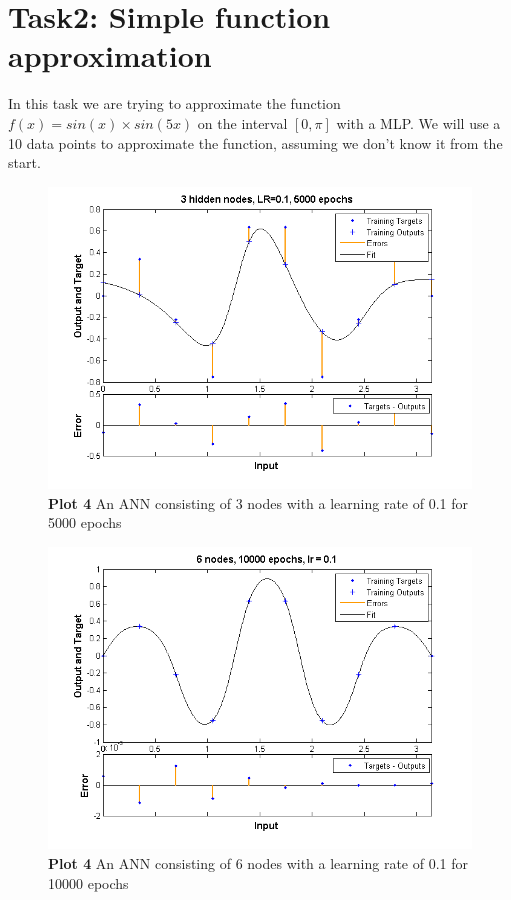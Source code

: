 \documentclass[a4paper]{article}
\begin{document}
\section{Task2: Simple function approximation}
In this task we are trying to approximate the function $f(x) = sin(x) \times sin(5x)$ on the interval $[0, \pi]$ with a MLP. We will use a 10 data points to approximate the function, assuming we don't know it from the start. 
\begin{figure}[h!] %
	\includegraphics[scale=0.8]{plot4_3nodes.png}
	\caption{\label{fig:plot4_3nodes.png}\textbf{Plot 4} An ANN consisting of 3 nodes with a learning rate of 0.1 for 5000 epochs}
\end{figure}
\begin{figure}[h!] %
	\includegraphics[scale=0.8]{plot4_6nodes.png}
	\caption{\label{fig:plot4_6nodes.png}\textbf{Plot 4} An ANN consisting of 6 nodes with a learning rate of 0.1 for 10000 epochs}
\end{figure}
\end{document}
